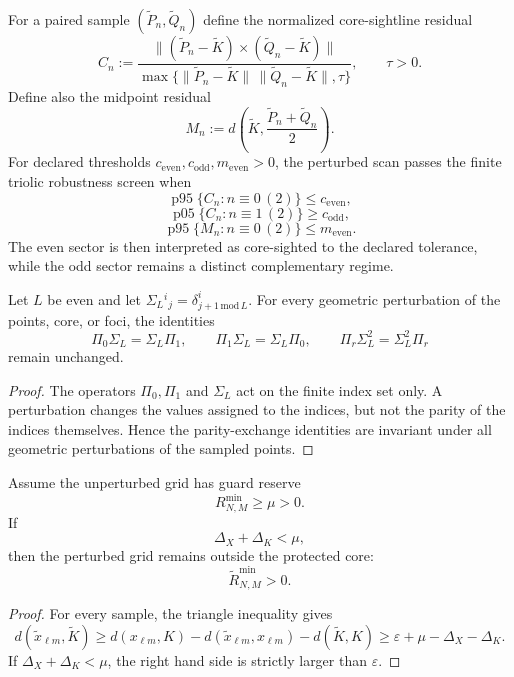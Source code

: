 \begin{definition}
\label{def:finite-triolic-residuals-perturbation}
For a paired sample $(\widetilde P_n,\widetilde Q_n)$ define the normalized core-sightline residual
\[
C_n:=
\frac{\| (\widetilde P_n-\widetilde K)\times(\widetilde Q_n-\widetilde K)\|}
{\max\{\|\widetilde P_n-\widetilde K\|\,\|\widetilde Q_n-\widetilde K\|,\tau\}},
\qquad \tau>0.
\]
Define also the midpoint residual
\[
M_n:=d\left(\widetilde K,\frac{\widetilde P_n+\widetilde Q_n}{2}\right).
\]
For declared thresholds $c_{\mathrm{even}},c_{\mathrm{odd}},m_{\mathrm{even}}>0$, the perturbed scan passes the finite triolic robustness screen when
\[
\operatorname{p95}\{C_n:n\equiv0\,(2)\}\leq c_{\mathrm{even}},
\]
\[
\operatorname{p05}\{C_n:n\equiv1\,(2)\}\geq c_{\mathrm{odd}},
\]
\[
\operatorname{p95}\{M_n:n\equiv0\,(2)\}\leq m_{\mathrm{even}}.
\]
The even sector is then interpreted as core-sighted to the declared tolerance, while the odd sector remains a distinct complementary regime.
\end{definition}

\begin{lemma}
\label{lem:index-parity-perturbation-invariant}
Let $L$ be even and let $\Sigma_L{}^i{}_j=\delta^i_{j+1\,\mathrm{mod}\,L}$.  For every geometric perturbation of the points, core, or foci, the identities
\[
\Pi_0\Sigma_L=\Sigma_L\Pi_1,
\qquad
\Pi_1\Sigma_L=\Sigma_L\Pi_0,
\qquad
\Pi_r\Sigma_L^2=\Sigma_L^2\Pi_r
\]
remain unchanged.
\end{lemma}

\begin{proof}
The operators $\Pi_0,\Pi_1$ and $\Sigma_L$ act on the finite index set only.  A perturbation changes the values assigned to the indices, but not the parity of the indices themselves.  Hence the parity-exchange identities are invariant under all geometric perturbations of the sampled points.
\end{proof}

\begin{lemma}
\label{lem:guard-robustness-small-perturbations}
Assume the unperturbed grid has guard reserve
\[
R_{N,M}^{\min}\geq \mu>0.
\]
If
\[
\Delta_X+\Delta_K<\mu,
\]
then the perturbed grid remains outside the protected core:
\[
\widetilde R_{N,M}^{\min}>0.
\]
\end{lemma}

\begin{proof}
For every sample, the triangle inequality gives
\[
d(\widetilde x_{\ell m},\widetilde K)
\geq d(x_{\ell m},K)-d(\widetilde x_{\ell m},x_{\ell m})-d(\widetilde K,K)
\geq \varepsilon+\mu-\Delta_X-\Delta_K.
\]
If $\Delta_X+\Delta_K<\mu$, the right hand side is strictly larger than $\varepsilon$.
\end{proof}

